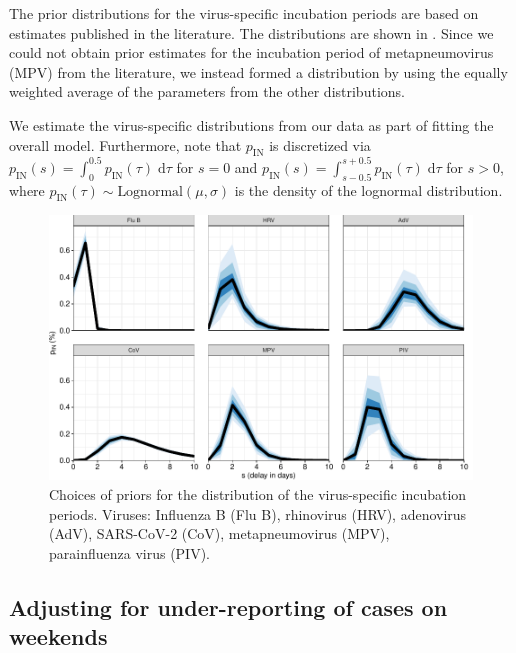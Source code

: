 \documentclass[fleqn,11pt]{wlscirep_supp}
\begin{document}
The prior distributions for the virus-specific incubation periods are based on estimates published in the literature\cite{McAloon2020,Lessler2009LancetID}. The distributions are shown in . Since we could not obtain prior estimates for the incubation period of metapneumovirus (MPV) from the literature, we instead formed a distribution by using the equally weighted average of the parameters from the other distributions. 

We estimate the virus-specific distributions from our data as part of fitting the overall model. Furthermore, note that $p_\text{IN}$ is discretized via $p_\text{IN}(s) = \int_0^{0.5} p_\text{IN}(\tau) \;\text{d}\tau$ for $s = 0$ and $p_\text{IN}(s) = \int_{s-0.5}^{s+0.5} p_\text{IN}(\tau) \;\text{d}\tau$ for $s > 0$, where $p_\text{IN}(\tau) \sim \textrm{Lognormal}(\mu, \sigma)$ is the density of the lognormal distribution. 

\begin{figure}[!htpb]
    \centering
    \includegraphics{../../results/epi-data/incubation-periods.pdf}
    \caption[Choices of priors for the incubation periods]{Choices of priors for the distribution of the virus-specific incubation periods. Viruses: Influenza B (Flu B), rhinovirus (HRV), adenovirus (AdV), SARS-CoV-2 (CoV), metapneumovirus (MPV), parainfluenza virus (PIV).}
    \label{fig:prior-pin}
\end{figure}

\subsection{Adjusting for under-reporting of cases on weekends}
\end{document}
